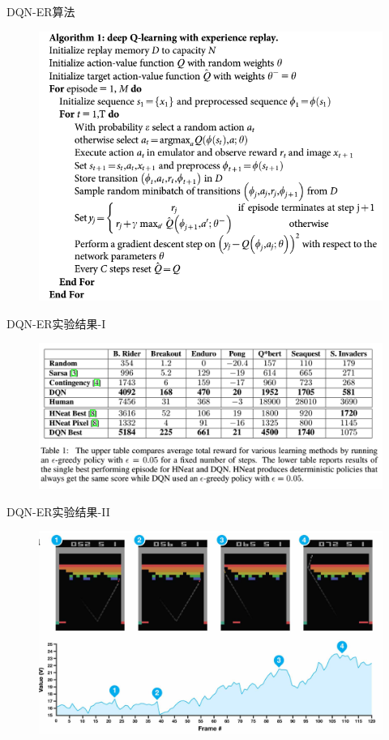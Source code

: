 \documentclass[10pt]{beamer}
\begin{document}
	\begin{frame}{DQN-ER}{算法}
		\begin{figure}
			\centering
			\includegraphics[width=0.9\linewidth]{pictures/drqn-alg}
		\end{figure}
	\end{frame}

	\begin{frame}{DQN-ER}{实验结果-I}
		\begin{figure}
			\centering
			\includegraphics[width=0.7\linewidth]{pictures/drqn-expr-result-tab}
		\end{figure}	
	\end{frame}

	\begin{frame}{DQN-ER}{实验结果-II}
		\begin{figure}
			\centering
			\includegraphics[width=0.7\linewidth]{pictures/drqn-expr-result-chart}
		\end{figure}
		
	\end{frame}
	
\end{document}
